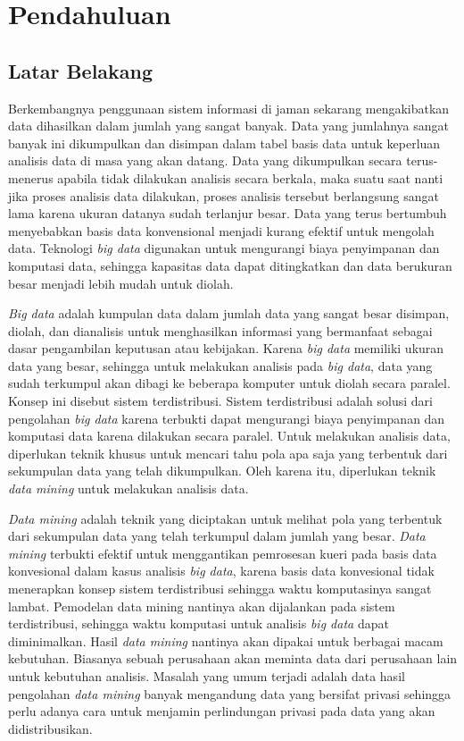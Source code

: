\chapter{Pendahuluan}
\label{chap:intro}
   
\section{Latar Belakang}
\label{sec:label}
Berkembangnya penggunaan sistem informasi di jaman sekarang mengakibatkan data dihasilkan dalam jumlah yang sangat banyak. Data yang jumlahnya sangat banyak ini dikumpulkan dan disimpan dalam tabel basis data untuk keperluan analisis data di masa yang akan datang. Data yang dikumpulkan secara terus-menerus apabila tidak dilakukan analisis secara berkala, maka suatu saat nanti jika proses analisis data dilakukan, proses analisis tersebut berlangsung sangat lama karena ukuran datanya sudah terlanjur besar. Data yang terus bertumbuh menyebabkan basis data konvensional menjadi kurang efektif untuk mengolah data. Teknologi \textit{big data} digunakan untuk mengurangi biaya penyimpanan dan komputasi data, sehingga kapasitas data dapat ditingkatkan dan data berukuran besar menjadi lebih mudah untuk diolah.

{\it Big data} adalah kumpulan data dalam jumlah data yang sangat besar disimpan, diolah, dan dianalisis untuk menghasilkan informasi yang bermanfaat sebagai dasar pengambilan keputusan atau kebijakan. Karena \textit{big data} memiliki ukuran data yang besar, sehingga untuk melakukan analisis pada \textit{big data}, data yang sudah terkumpul akan dibagi ke beberapa komputer untuk diolah secara paralel. Konsep ini disebut sistem terdistribusi. Sistem terdistribusi adalah solusi dari pengolahan \textit{big data} karena terbukti dapat mengurangi biaya penyimpanan dan komputasi data karena dilakukan secara paralel. Untuk melakukan analisis data, diperlukan teknik khusus untuk mencari tahu pola apa saja yang terbentuk dari sekumpulan data yang telah dikumpulkan. Oleh karena itu, diperlukan teknik \textit{data mining} untuk melakukan analisis data.


{\it Data mining} adalah teknik yang diciptakan untuk melihat pola yang terbentuk dari sekumpulan data yang telah terkumpul dalam jumlah yang besar. {\it Data mining} terbukti efektif untuk menggantikan pemrosesan kueri pada basis data konvesional dalam kasus analisis \textit{big data}, karena basis data konvesional tidak menerapkan konsep sistem terdistribusi sehingga waktu komputasinya sangat lambat. Pemodelan data mining nantinya akan dijalankan pada sistem terdistribusi, sehingga waktu komputasi untuk analisis \textit{big data} dapat diminimalkan. Hasil \textit{data mining} nantinya akan dipakai untuk berbagai macam kebutuhan. Biasanya sebuah perusahaan akan meminta data dari perusahaan lain untuk kebutuhan analisis. Masalah yang umum terjadi adalah data hasil pengolahan \textit{data mining} banyak mengandung data yang bersifat privasi sehingga perlu adanya cara untuk menjamin perlindungan privasi pada data yang akan didistribusikan.

